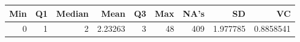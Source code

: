 
\begin{tabular}[t]{rrrrrrrrr}
\toprule
Min & Q1 & Median & Mean & Q3 & Max & NA's & SD & VC\\
\midrule
0 & 1 & 2 & 2.23263 & 3 & 48 & 409 & 1.977785 & 0.8858541\\
\bottomrule
\end{tabular}